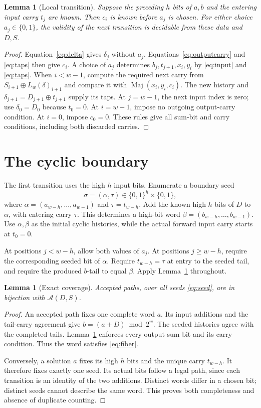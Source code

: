 \documentclass[11pt,a4paper]{article}
\newtheorem{lemma}[theorem]{Lemma}
\theoremstyle{definition}\newtheorem{definition}[theorem]{Definition}
\newcommand{\B}{\{0,1\}}
\newcommand{\maj}{\operatorname{Maj}}
\begin{document}
\begin{lemma}[Local transition]\label{lem:transition}
Suppose the preceding $h$ bits of $a,b$ and the entering input carry $t_j$ are known.
Then $c_i$ is known before $a_j$ is chosen. For either choice $a_j\in\B$,
the validity of the next transition is decidable from these data and $D,S$.
\end{lemma}
\begin{proof}
Equation~\eqref{eq:delta} gives $\delta_j$ without $a_j$.
Equations~\eqref{eq:outputcarry} and \eqref{eq:taps} then give $c_i$.
A choice of $a_j$ determines $b_j,t_{j+1},x_i,y_i$ by \eqref{eq:input}
and \eqref{eq:taps}. When $i<w-1$, compute the required next carry from
$S_{i+1}\oplus L_w(\delta)_{i+1}$ and compare it with $\maj(x_i,y_i,c_i)$.
The new history and $\delta_{j+1}=D_{j+1}\oplus t_{j+1}$ supply its taps.
At $j=w-1$, the next input index is zero; use $\delta_0=D_0$ because $t_0=0$.
At $i=w-1$, impose no outgoing output-carry condition. At $i=0$, impose $c_0=0$.
These rules give all sum-bit and carry conditions, including both discarded carries.
\end{proof}

\section{The cyclic boundary}
The first transition uses the high $h$ input bits.
Enumerate a boundary seed
\begin{equation}\label{eq:seed}
 \sigma=(\alpha,\tau)\in\B^h\times\B,
\end{equation}
where $\alpha=(a_{w-h},\ldots,a_{w-1})$ and $\tau=t_{w-h}$.
Add the known high $h$ bits of $D$ to $\alpha$, with entering carry $\tau$.
This determines a high-bit word $\beta=(b_{w-h},\ldots,b_{w-1})$.
Use $\alpha,\beta$ as the initial cyclic histories, while the actual forward
input carry starts at $t_0=0$.

At positions $j<w-h$, allow both values of $a_j$.
At positions $j\geq w-h$, require the corresponding seeded bit of $\alpha$.
Require $t_{w-h}=\tau$ at entry to the seeded tail, and require the produced
$b$-tail to equal $\beta$. Apply Lemma~\ref{lem:transition} throughout.

\begin{lemma}[Exact coverage]\label{lem:coverage}
Accepted paths, over all seeds \eqref{eq:seed}, are in bijection with
$\mathcal A(D,S)$.
\end{lemma}
\begin{proof}
An accepted path fixes one complete word $a$.
Its input additions and the tail-carry agreement give
$b=(a+D)\bmod 2^w$. The seeded histories agree with the completed tails.
Lemma~\ref{lem:transition} enforces every output sum bit and its carry condition.
Thus the word satisfies \eqref{eq:fiber}.

Conversely, a solution $a$ fixes its high $h$ bits and the unique carry $t_{w-h}$.
It therefore fixes exactly one seed. Its actual bits follow a legal path,
since each transition is an identity of the two additions.
Distinct words differ in a chosen bit; distinct seeds cannot describe the same word.
This proves both completeness and absence of duplicate counting.
\end{proof}
\end{document}
